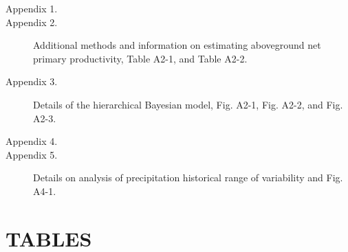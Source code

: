 \documentclass[fleqn,10pt,lineno]{wlpeerj} %
\begin{document}
\begin{description}
\item [Appendix 1.] 
\item [Appendix 2.] Additional methods and information on estimating aboveground net primary productivity, Table A2-1, and Table A2-2.
\item [Appendix 3.] Details of the hierarchical Bayesian model, Fig. A2-1, Fig. A2-2, and Fig. A2-3.
\item [Appendix 4.] 
\item [Appendix 5.] Details on analysis of precipitation historical range of variability and Fig. A4-1.
\end{description}

\newpage{}

\section{TABLES}\label{tables}
\end{document}
